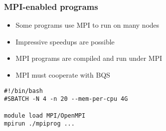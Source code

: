 \documentclass[10pt]{beamer}
\begin{document}
\begin{frame}[fragile]
\frametitle{MPI-enabled programs}
\begin{itemize}
\item Some programs use MPI to run on many nodes
\item Impressive speedups are possible
\item MPI programs are compiled and run under MPI
\item MPI must cooperate with BQS
\end{itemize}

\begin{block}{}
\begin{verbatim}
#!/bin/bash
#SBATCH -N 4 -n 20 --mem-per-cpu 4G

module load MPI/OpenMPI
mpirun ./mpiprog ...
\end{verbatim}
\end{block}{}
\end{frame}
\end{document}
